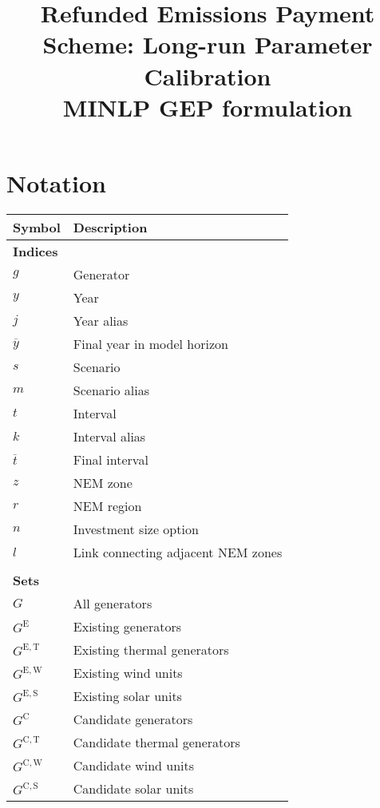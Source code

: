 \documentclass{article}
\title{Refunded Emissions Payment Scheme: Long-run Parameter Calibration\\MINLP GEP formulation}
\newcommand{\sGenerators}{G}
\newcommand{\sGeneratorsExisting}{G^{\mathrm{E}}}
\newcommand{\sGeneratorsExistingThermal}{G^{\mathrm{E,T}}}
\newcommand{\sGeneratorsExistingWind}{G^{\mathrm{E,W}}}
\newcommand{\sGeneratorsExistingSolar}{G^{\mathrm{E,S}}}
\newcommand{\sGeneratorsCandidate}{G^{\mathrm{C}}}
\newcommand{\sGeneratorsCandidateThermal}{G^{\mathrm{C,T}}}
\newcommand{\sGeneratorsCandidateWind}{G^{\mathrm{C,W}}}
\newcommand{\sGeneratorsCandidateSolar}{G^{\mathrm{C,S}}}
\newcommand{\iGenerator}{g}
\newcommand{\iYear}{y}
\newcommand{\iYearTerminal}{\overline{\iYear}}
\newcommand{\iYearAlias}{j}
\newcommand{\iScenario}{s}
\newcommand{\iScenarioAlias}{m}
\newcommand{\iInterval}{t}
\newcommand{\iIntervalAlias}{k}
\newcommand{\iIntervalTerminal}{\overline{\iInterval}}
\newcommand{\iZone}{z}
\newcommand{\iRegion}{r}
\newcommand{\iInvestmentSizeOption}{n}
\newcommand{\iLink}{l}
\begin{document}
	\maketitle
	

\section{Notation}
\renewcommand*{\arraystretch}{1.3}
\begin{longtable}{ p{}  p{}}
	\textbf{Symbol} & \textbf{Description}\\
	\hline\hline
	\multicolumn{2}{l}{\textbf{Indices}}\\
	$\iGenerator$ & Generator\\ 
	$\iYear$ & Year\\
	$\iYearAlias$ & Year alias\\
	$\iYearTerminal$ & Final year in model horizon\\
	$\iScenario$ & Scenario\\
	$\iScenarioAlias$ & Scenario alias\\
	$\iInterval$ & Interval\\
	$\iIntervalAlias$ & Interval alias\\
	$\iIntervalTerminal$ & Final interval\\
	$\iZone$ & NEM zone\\
	$\iRegion$ & NEM region\\
	$\iInvestmentSizeOption$ & Investment size option\\
	$\iLink$ & Link connecting adjacent NEM zones\\
	& \\
	\multicolumn{2}{l}{\textbf{Sets}}\\
	$\sGenerators$ & All generators\\
	$\sGeneratorsExisting$ & Existing generators\\
	$\sGeneratorsExistingThermal$ & Existing thermal generators\\
	$\sGeneratorsExistingWind$ & Existing wind units\\
	$\sGeneratorsExistingSolar$ & Existing solar units\\
	$\sGeneratorsCandidate$ & Candidate generators\\
	$\sGeneratorsCandidateThermal$ & Candidate thermal generators\\
	$\sGeneratorsCandidateWind$ & Candidate wind units\\
	$\sGeneratorsCandidateSolar$ & Candidate solar units\\

\end{longtable}
\end{document}
